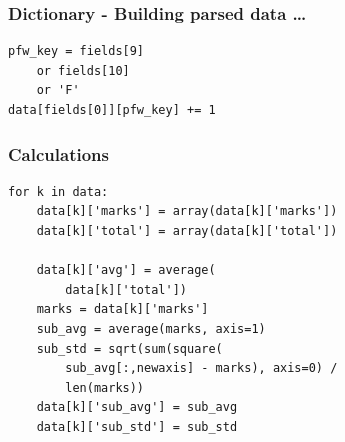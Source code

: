 \documentclass[14pt,compress]{beamer}
\begin{document}
\begin{frame}[fragile]
  \frametitle{Dictionary - Building parsed data \ldots}
  \begin{lstlisting}
pfw_key = fields[9]
    or fields[10]
    or 'F'
data[fields[0]][pfw_key] += 1
  \end{lstlisting}
\end{frame}

\begin{frame}[fragile]
  \frametitle{Calculations}
  \small
  \begin{lstlisting}
for k in data:
    data[k]['marks'] = array(data[k]['marks'])
    data[k]['total'] = array(data[k]['total'])

    data[k]['avg'] = average(
        data[k]['total'])
    marks = data[k]['marks']
    sub_avg = average(marks, axis=1)
    sub_std = sqrt(sum(square(
        sub_avg[:,newaxis] - marks), axis=0) /
        len(marks))
    data[k]['sub_avg'] = sub_avg
    data[k]['sub_std'] = sub_std
  \end{lstlisting}
\end{frame}
\end{document}
